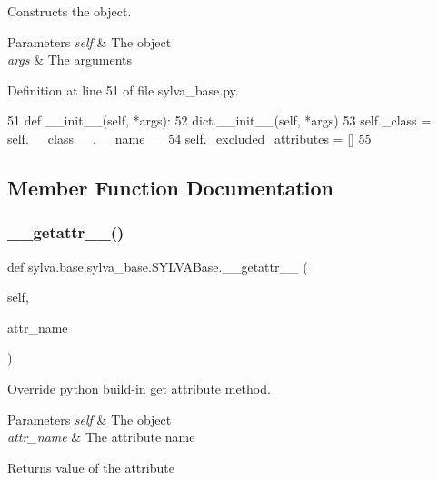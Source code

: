 Constructs the object. 


\begin{DoxyParams}{Parameters}
{\em self} & The object \\
\hline
{\em args} & The arguments \\
\hline
\end{DoxyParams}


Definition at line 51 of file sylva\+\_\+base.\+py.


\begin{DoxyCode}
51     \textcolor{keyword}{def }\_\_init\_\_(self, *args):
52         dict.\_\_init\_\_(self, *args)
53         self.\_class = self.\_\_class\_\_.\_\_name\_\_
54         self.\_excluded\_attributes = []
55 
\end{DoxyCode}


\subsection{Member Function Documentation}
\mbox{\label{classsylva_1_1base_1_1sylva__base_1_1_s_y_l_v_a_base_af30165f6499a5efacb683c2194f53a73}} 
\subsubsection{\texorpdfstring{\+\_\+\+\_\+getattr\+\_\+\+\_\+()}{\_\_getattr\_\_()}}
{\footnotesize\ttfamily def sylva.\+base.\+sylva\+\_\+base.\+S\+Y\+L\+V\+A\+Base.\+\_\+\+\_\+getattr\+\_\+\+\_\+ (\begin{DoxyParamCaption}\item[{}]{self,  }\item[{}]{attr\+\_\+name }\end{DoxyParamCaption})}



Override python build-\/in get attribute method. 


\begin{DoxyParams}{Parameters}
{\em self} & The object \\
\hline
{\em attr\+\_\+name} & The attribute name\\
\hline
\end{DoxyParams}
\begin{DoxyReturn}{Returns}
value of the attribute 
\end{DoxyReturn}


